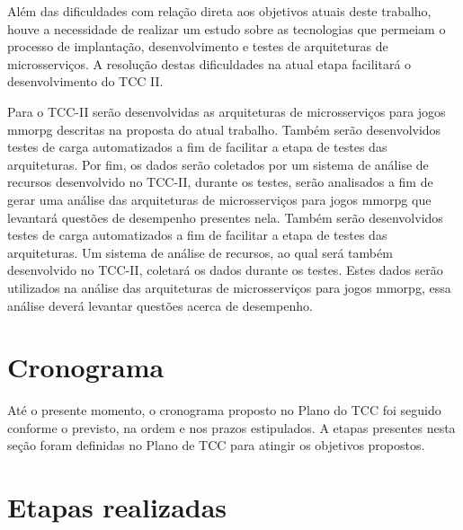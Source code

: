 Além das dificuldades com relação direta aos objetivos atuais deste trabalho, houve a necessidade de realizar um estudo sobre as tecnologias que permeiam o processo de implantação, desenvolvimento e testes de arquiteturas de microsserviços.
%
A resolução destas dificuldades na atual etapa facilitará o desenvolvimento do TCC II.

Para o TCC-II serão desenvolvidas as arquiteturas de microsserviços para jogos \ac{mmorpg} descritas na proposta do atual trabalho.
%
Também serão desenvolvidos testes de carga automatizados a fim de facilitar a etapa de testes das arquiteturas.
%
Por fim, os dados serão coletados por um sistema de análise de recursos desenvolvido no TCC-II, durante os testes, serão analisados a fim de gerar uma análise das arquiteturas de microsserviços para jogos \ac{mmorpg} que levantará questões de desempenho presentes nela.
%
Também serão desenvolvidos testes de carga automatizados a fim de facilitar a etapa de testes das arquiteturas.
%
Um sistema de análise de recursos, ao qual será também desenvolvido no TCC-II, coletará os dados durante os testes. Estes dados serão utilizados na análise das arquiteturas de microsserviços para jogos \ac{mmorpg}, essa análise deverá levantar questões acerca de desempenho.


\section{Cronograma}



Até o presente momento, o cronograma proposto no Plano do TCC foi seguido conforme o previsto, na ordem e nos prazos estipulados.
%
A etapas presentes nesta seção foram definidas no Plano de TCC para atingir os objetivos propostos.



\section{Etapas realizadas}



